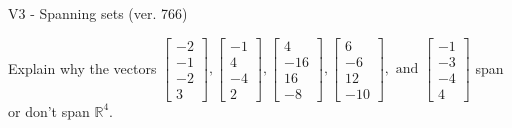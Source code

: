 \begin{exercise}
  \begin{exerciseTitle}V3 - Spanning sets (ver. 766)\end{exerciseTitle}
  \begin{exerciseStatement}
    Explain why the vectors \(\left[\begin{array}{r}
-2 \\
-1 \\
-2 \\
3
\end{array}\right] , \left[\begin{array}{r}
-1 \\
4 \\
-4 \\
2
\end{array}\right] , \left[\begin{array}{r}
4 \\
-16 \\
16 \\
-8
\end{array}\right] , \left[\begin{array}{r}
6 \\
-6 \\
12 \\
-10
\end{array}\right] , \text{ and } \left[\begin{array}{r}
-1 \\
-3 \\
-4 \\
4
\end{array}\right]\) span or don't span \(\mathbb{R}^4\). 
	



\end{exerciseStatement}
\end{exercise}
